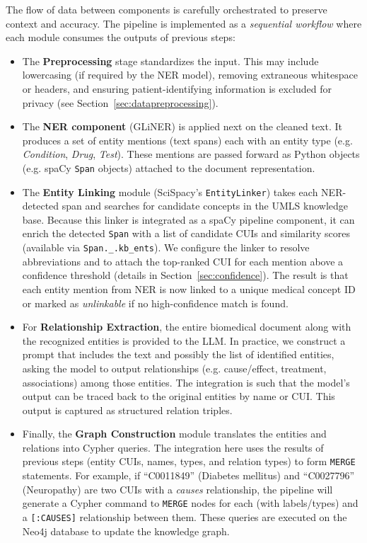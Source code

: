 The flow of data between components is carefully orchestrated to preserve context and accuracy. The pipeline is implemented as a \textit{sequential workflow} where each module consumes the outputs of previous steps:

\begin{itemize}
\item The \textbf{Preprocessing} stage standardizes the input. This may include lowercasing (if required by the NER model), removing extraneous whitespace or headers, and ensuring patient-identifying information is excluded for privacy (see Section~\ref{sec:datapreprocessing}).
\item The \textbf{NER component} (GLiNER) is applied next on the cleaned text. It produces a set of entity mentions (text spans) each with an entity type (e.g. \textit{Condition}, \textit{Drug}, \textit{Test}). These mentions are passed forward as Python objects (e.g. spaCy \texttt{Span} objects) attached to the document representation.
\item The \textbf{Entity Linking} module (SciSpacy's \texttt{EntityLinker}) takes each NER-detected span and searches for candidate concepts in the UMLS knowledge base. Because this linker is integrated as a spaCy pipeline component, it can enrich the detected \texttt{Span} with a list of candidate CUIs and similarity scores (available via \texttt{Span.\_.kb\_ents}). We configure the linker to resolve abbreviations and to attach the top-ranked CUI for each mention above a confidence threshold (details in Section~\ref{sec:confidence}). The result is that each entity mention from NER is now linked to a unique medical concept ID or marked as \textit{unlinkable} if no high-confidence match is found.
\item For \textbf{Relationship Extraction}, the entire biomedical document along with the recognized entities is provided to the LLM. In practice, we construct a prompt that includes the text and possibly the list of identified entities, asking the model to output relationships (e.g. cause/effect, treatment, associations) among those entities. The integration is such that the model's output can be traced back to the original entities by name or CUI. This output is captured as structured relation triples.
\item Finally, the \textbf{Graph Construction} module translates the entities and relations into Cypher queries. The integration here uses the results of previous steps (entity CUIs, names, types, and relation types) to form \texttt{MERGE} statements. For example, if ``C0011849'' (Diabetes mellitus) and ``C0027796'' (Neuropathy) are two CUIs with a \textit{causes} relationship, the pipeline will generate a Cypher command to \texttt{MERGE} nodes for each (with labels/types) and a \texttt{[:CAUSES]} relationship between them. These queries are executed on the Neo4j database to update the knowledge graph.
\end{itemize}

